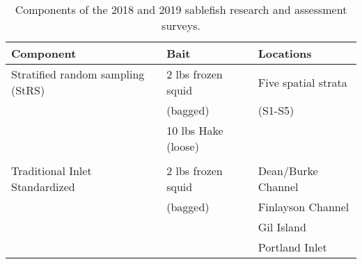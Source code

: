 \documentclass[12pt]{article}\usepackage[]{graphicx}\usepackage[]{color}
\begin{document}
\begin{table}

\caption{\label{tab:table2}Components of the 2018 and 2019 sablefish research and assessment surveys.}
\centering
\fontsize{8}{10}\selectfont
\begin{tabular}[t]{lll}
\toprule
Component & Bait & Locations\\
\midrule
Stratified random sampling (StRS) & 2 lbs frozen squid & Five spatial strata\\
 & (bagged) & (S1-S5)\\
 & 10 lbs Hake (loose) & \\
 &  & \\
\hline
Traditional Inlet Standardized & 2 lbs frozen squid & Dean/Burke Channel\\
 & (bagged) & Finlayson Channel\\
 &  & Gil Island\\
 &  & Portland Inlet\\
\bottomrule
\end{tabular}
\end{table}
\end{document}
